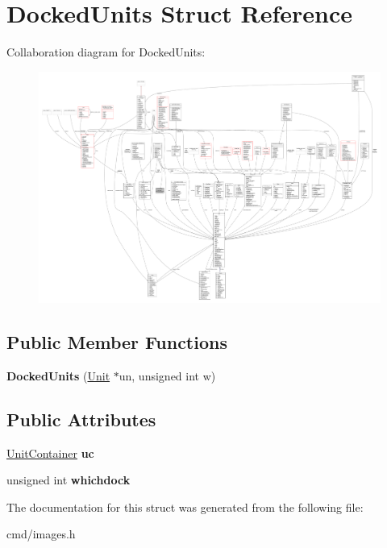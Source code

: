 \hypertarget{structDockedUnits}{}\section{Docked\+Units Struct Reference}
\label{structDockedUnits}


Collaboration diagram for Docked\+Units\+:
\nopagebreak
\begin{figure}[H]
\begin{center}
\leavevmode
\includegraphics[width=350pt]{de/dbd/structDockedUnits__coll__graph}
\end{center}
\end{figure}
\subsection*{Public Member Functions}
\begin{DoxyCompactItemize}
\item 
{\bfseries Docked\+Units} (\hyperlink{classUnit}{Unit} $\ast$un, unsigned int w)\hypertarget{structDockedUnits_a450c61e9bc2e4df0b4f2bdb35be04215}{}\label{structDockedUnits_a450c61e9bc2e4df0b4f2bdb35be04215}

\end{DoxyCompactItemize}
\subsection*{Public Attributes}
\begin{DoxyCompactItemize}
\item 
\hyperlink{classUnitContainer}{Unit\+Container} {\bfseries uc}\hypertarget{structDockedUnits_ae3063e4024020e3c8f1b917452dcdaab}{}\label{structDockedUnits_ae3063e4024020e3c8f1b917452dcdaab}

\item 
unsigned int {\bfseries whichdock}\hypertarget{structDockedUnits_a3f6796e1121c4e224d7f7ae274cb01cb}{}\label{structDockedUnits_a3f6796e1121c4e224d7f7ae274cb01cb}

\end{DoxyCompactItemize}


The documentation for this struct was generated from the following file\+:\begin{DoxyCompactItemize}
\item 
cmd/images.\+h\end{DoxyCompactItemize}
